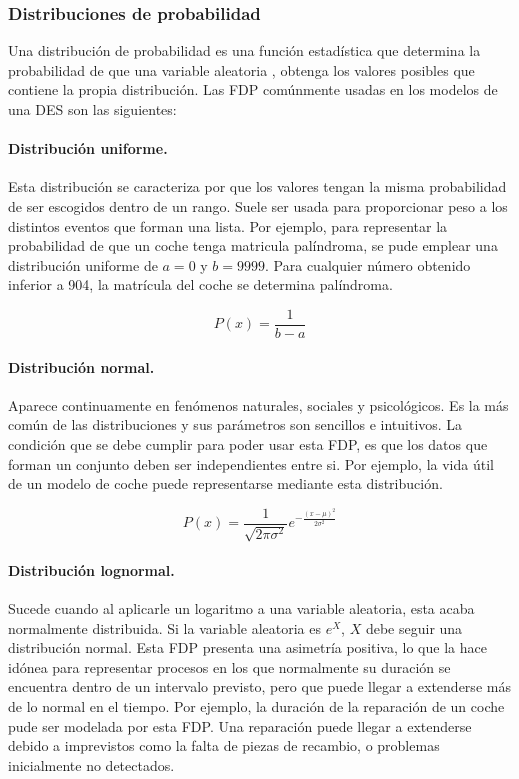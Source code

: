 \subsubsection{Distribuciones de probabilidad}\label{sec_prob_dist}

Una distribución de probabilidad es una función estadística
que determina la probabilidad de que una variable aleatoria 
\citep{simon2002probability},
obtenga los valores posibles que contiene la propia distribución.
Las FDP comúnmente usadas
en los modelos de una DES son las siguientes:

\paragraph{Distribución uniforme.} Esta distribución
se caracteriza por que los valores tengan
la misma probabilidad de ser escogidos dentro de un rango.
Suele ser usada para proporcionar peso
a los distintos eventos que forman una lista.
Por ejemplo, para representar la probabilidad de
que un coche tenga matricula palíndroma,
se pude emplear una distribución uniforme de $a=0$ y $b=9999$.
Para cualquier número obtenido inferior a 904,
la matrícula del coche se determina palíndroma.

\begin{equation}
	P(x) = \frac{1}{b-a}
\end{equation}

\paragraph{Distribución normal.} Aparece continuamente
en fenómenos naturales, sociales y psicológicos.
Es la más común de las distribuciones
y sus parámetros son sencillos e intuitivos.
La condición que se debe cumplir para poder usar esta FDP,
es que los datos que forman un conjunto
deben ser independientes entre si.
Por ejemplo, la vida útil de un modelo de coche
puede representarse mediante esta distribución.

\begin{equation}
	P(x) = \frac{1}{\sqrt{2 \pi \sigma ^{2}}} e^{-\frac{(x-\mu)^{2}}{2\sigma ^{2}}}
\end{equation}

\paragraph{Distribución lognormal.} Sucede cuando al aplicarle
un logaritmo a una variable aleatoria,
esta acaba normalmente distribuida.
Si la variable aleatoria es $e^X$, $X$
debe seguir una distribución normal.
Esta FDP presenta una asimetría positiva,
lo que la hace idónea para representar procesos
en los que normalmente su duración se encuentra
dentro de un intervalo previsto,
pero que puede llegar a extenderse más de lo normal en el tiempo.
Por ejemplo, la duración de la reparación de un coche
pude ser modelada por esta FDP.
Una reparación puede llegar a extenderse debido a
imprevistos como la falta de piezas de recambio,
o problemas inicialmente no detectados.

